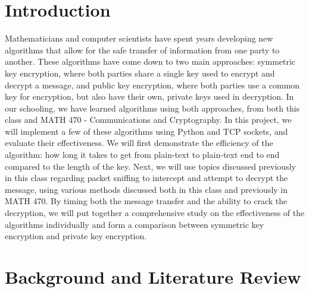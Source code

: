 \documentclass[12pt]{report}
\begin{document}
\section{Introduction}
Mathematicians and computer scientists have spent years developing new algorithms that allow for the safe transfer of information from one party to another. These algorithms have come down to two main approaches: symmetric key encryption, where both parties share a single key used to encrypt and decrypt a message, and public key encryption, where both parties use a common key for encryption, but also have their own, private keys used in decryption. In our schooling, we have learned algorithms using both approaches, from both this class and MATH 470 - Communications and Cryptography. In this project, we will implement a few of these algorithms using Python and TCP sockets, and evaluate their effectiveness. We will first demonstrate the efficiency of the algorithm: how long it takes to get from plain-text to plain-text end to end compared to the length of the key. Next, we will use topics discussed previously in this class regarding packet sniffing to intercept and attempt to decrypt the message, using various methods discussed both in this class and previously in MATH 470. By timing both the message transfer and the ability to crack the decryption, we will put together a comprehensive study on the effectiveness of the algorithms individually and form a comparison between symmetric key encryption and private key encryption.

\section{Background and Literature Review}

\iffalse
\newpage

\begin{thebibliography}{9}

    \bibitem{ieee}
    IEEE-CS/ACM Joint Task Force on Software Engineering Ethics and Professional Practices\\
    \texttt{https://www.computer.org/web/education/code-of-ethics}

\end{thebibliography}
\fi
\end{document}
